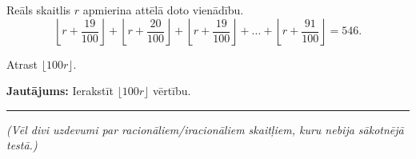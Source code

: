 \documentclass[a4paper,12pt]{article}
\newcommand\answer[1]{}
\begin{document}
\vspace{10pt}
\begin{problem}
Reāls skaitlis $r$ apmierina attēlā doto vienādību.
\[ \left\lfloor r+\frac{19}{100} \right\rfloor + \left\lfloor r+\frac{20}{100} \right\rfloor + 
\left\lfloor r+\frac{19}{100} \right\rfloor + \ldots + \left\lfloor r+\frac{91}{100} \right\rfloor = 546. \]

Atrast $\lfloor 100r \rfloor$. 

{\bf Jautājums:} Ierakstīt $\lfloor 100r \rfloor$ vērtību.
\answer{

{\bf Atbilde.} $\mathtt{743}$\\

Izteiksmē ir $91 - 19 + 1 = 73$ saskaitāmie, jebkuri divi no tiem atšķiras ne vairāk kā par $1$. 
Noskaidrosim, cik un kādus saskaitāmos izvēlēties, lai to summa būtu $546$. 
Dalot $546$ ar $73$ (ar atlikumu) iegūsim: 
\[ 546 = 7 \cdot 73 + 35. \]
Tādēļ $546$ var iegūt, saskaitot $38$ septiņniekus un $35$ astoņniekus. 

$19 + 38 = 57$ ir mazākais no daļu skaitītājiem $n$, kam ${\displaystyle \left\lfloor r+\frac{n}{100} \right\rfloor}$ vienāds ar $8$. 
Atrisinām vienādojumu: 
\[ r + \frac{57}{100} = 8. \]
Pieskaitot mazākas daļas nekā $57/100$, veselajai daļai būs jānoapaļojas uz leju \textendash{} uz vērtību $7$. 

Iegūstam $r = 8 - 0.57 = 7.43$. Tāpēc $100r = 743$. 

{\em Piezīme.} Kā $r$ vērtības der arī visi citi skaitļi intervālā $r \in [7.43; 7.44)$, jo tiem visas veselās daļas
noapaļosies precīzi tāpat. Bet lielākām $r$ vērtībām, pareizais skaits ar ``septiņniekiem'' un ``astoņniekiem'' $73$ saskaitāmo 
summā tiks izjaukts, tās neder. Tāpēc noteikti jāizpildās $\lfloor 100r \rfloor = 743$. 
}
\end{problem}


\begin{center}
\rule{4in}{.4pt}
\end{center}

\vspace{5pt}
{\em (Vēl divi uzdevumi par racionāliem/iracionāliem skaitļiem, kuru nebija sākotnējā testā.)}
\end{document}
